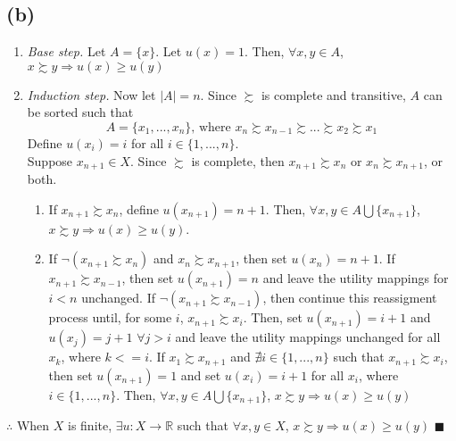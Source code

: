 \documentclass{article}
\newcommand{\R}{\mathbb{R}}
\newcommand{\union}{\bigcup}
\begin{document}
\subsection*{(b)}
\begin{enumerate}
	\item \textit{Base step.} Let $A=\{x\}$. Let $u(x) = 1$. Then, $\forall x,y\in A$, $x\succsim y\Rightarrow u(x)\geq u(y)$
	
	\item \textit{Induction step.}  Now let $|A|=n$. Since $\succsim$ is complete and transitive, $A$ can be sorted such that
		\[
			A=\{x_1,...,x_n\}\text{, where } x_n\succsim x_{n-1} \succsim ... \succsim x_2\succsim x_1
		\]
		Define $u(x_i)=i$ for all $i\in\{1,...,n\}$. 
		\medskip \\
		Suppose $x_{n+1}\in X$. Since $\succsim$ is complete, then $x_{n+1}\succsim x_n$ or $x_n\succsim x_{n+1}$, or both.
		\begin{enumerate}
			\item If $x_{n+1}\succsim x_n$, define $u(x_{n+1})=n+1$. Then, $\forall x,y\in A\union\{x_{n+1}\}$, $x\succsim y\Rightarrow u(x)\geq u(y)$.
			\item If ${\neg(x_{n+1}\succsim x_n)}$ and ${x_n\succsim x_{n+1}}$, then set $u(x_n)=n+1$. If ${x_{n+1}\succsim x_{n-1}}$, then set ${u(x_{n+1})=n}$ and leave the utility mappings for $i<n$ unchanged. If ${\neg(x_{n+1}\succsim x_{n-1})}$, then continue this reassigment process until, for some ${i}$, ${x_{n+1}\succsim x_i}$. Then, set ${u(x_{n+1})=i+1}$ and ${u(x_j)=j+1}$ ${\forall j>i}$ and leave the utility mappings unchanged for all ${x_k}$, where ${k<=i}$. If ${x_1\succsim x_{n+1}}$ and ${\nexists i\in\{1,...,n\}}$ such that ${x_{n+1}\succsim x_i}$, then set ${u(x_{n+1}) = 1}$ and set ${u(x_i)=i+1}$ for all $x_i$, where ${i\in\{1,...,n\}}$. Then, ${\forall x,y\in A\union\{x_{n+1}\}}$, ${x\succsim y\Rightarrow u(x)\geq u(y)}$
		\end{enumerate}
	
\end{enumerate}
$\therefore$ When $X$ is finite, $\exists u:X\rightarrow\R$ such that $\forall x,y\in X$, $x\succsim y\Rightarrow u(x)\geq u(y)$ $\blacksquare$


\end{document}
